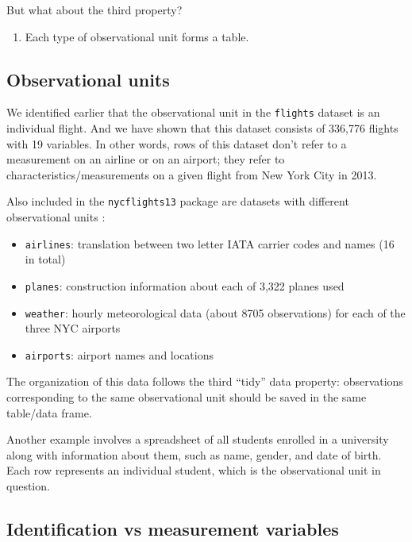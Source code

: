 \documentclass[12pt,]{krantz}
\providecommand{\tightlist}{%
  \setlength{\itemsep}{0pt}\setlength{\parskip}{0pt}}
\renewenvironment{quote}{\begin{VF}}{\end{VF}}
\begin{document}
But what about the third property?

\begin{quote}
\begin{enumerate}
\def\labelenumi{\arabic{enumi}.}
\setcounter{enumi}{2}
\tightlist
\item
  Each type of observational unit forms a table.
\end{enumerate}
\end{quote}

\subsection{Observational units}\label{observational-units}

We identified earlier that the observational unit in the
\texttt{flights} dataset is an individual flight. And we have shown that
this dataset consists of 336,776 flights with 19 variables. In other
words, rows of this dataset don't refer to a measurement on an airline
or on an airport; they refer to characteristics/measurements on a given
flight from New York City in 2013.

Also included in the \texttt{nycflights13} package are datasets with
different observational units \citep{R-nycflights13}:

\begin{itemize}
\tightlist
\item
  \texttt{airlines}: translation between two letter IATA carrier codes
  and names (16 in total)
\item
  \texttt{planes}: construction information about each of 3,322 planes
  used
\item
  \texttt{weather}: hourly meteorological data (about 8705 observations)
  for each of the three NYC airports
\item
  \texttt{airports}: airport names and locations
\end{itemize}

The organization of this data follows the third ``tidy'' data property:
observations corresponding to the same observational unit should be
saved in the same table/data frame.

Another example involves a spreadsheet of all students enrolled in a
university along with information about them, such as name, gender, and
date of birth. Each row represents an individual student, which is the
observational unit in question.

\subsection{Identification vs measurement
variables}\label{identification-vs-measurement}
\end{document}
